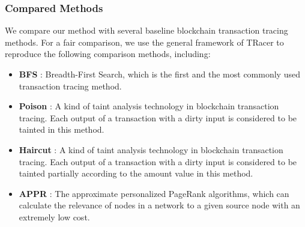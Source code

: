 
\subsubsection{Compared Methods}
We compare our method with several baseline blockchain transaction tracing methods. For a fair comparison, we use the general framework of TRacer to reproduce the following comparison methods, including:
\begin{itemize}
    \item \textbf{BFS} \cite{zhao2015graph}: Breadth-First Search, which is the first and the most commonly used transaction tracing method.
    \item \textbf{Poison} \cite{moser2014towards}: A kind of taint analysis technology in blockchain transaction tracing. Each output of a transaction with a dirty input is considered to be tainted in this method.
    \item \textbf{Haircut} \cite{moser2014towards}: A kind of taint analysis technology in blockchain transaction tracing. Each output of a transaction with a dirty input is considered to be tainted partially according to the amount value in this method. 
    \item \textbf{APPR} \cite{andersen2006local}: The approximate personalized PageRank algorithms, which can calculate the relevance of nodes in a network to a given source node with an extremely low cost.
\end{itemize}

